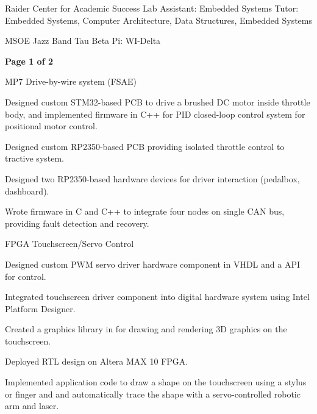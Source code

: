\documentclass[11pt]{article}
\begin{document}

\sectiontutor
{Raider Center for Academic Success}
{Lab Assistant: Embedded Systems}{}
{Tutor: Embedded Systems, Computer Architecture, Data Structures, Embedded Systems}{}

\vspace{-1.6ex}
\sectionsingle
{MSOE Jazz Band}{}
\vspace{-1.4ex}
\sectionsingle
{Tau Beta Pi: WI-Delta}{}
\vspace{0.5ex}

\vfill
\hfill {\bfseries{Page 1 of 2}}



\sectionproj
{MP7 Drive-by-wire system (FSAE)} 
{\begin{circlist}
  \item Designed custom STM32-based PCB to drive a brushed DC motor inside throttle body, and implemented firmware in C++ for PID closed-loop control system for positional motor control.
  \item Designed custom RP2350-based PCB providing isolated throttle control to tractive system.
  \item Designed two RP2350-based hardware devices for driver interaction (pedalbox, dashboard).
  \item Wrote firmware in C and C++ to integrate four nodes on single CAN bus, providing fault detection and recovery.
\end{circlist}}
\sectionproj
{FPGA Touchscreen/Servo Control} 
{\begin{circlist}
  \item Designed custom PWM servo driver hardware component in VHDL and a  API for control.
  \item Integrated touchscreen driver component into digital hardware system using Intel Platform Designer.
  \item Created a graphics library in  for drawing and rendering 3D graphics on the touchscreen.
  \item Deployed RTL design on Altera MAX 10 FPGA. 
  \item Implemented application code to draw a shape on the touchscreen using a stylus or finger and and automatically trace the shape with a servo-controlled robotic arm and laser. 
\end{circlist}}
\end{document}

